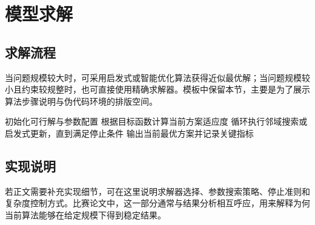 \section{模型求解}

\subsection{求解流程}

当问题规模较大时，可采用启发式或智能优化算法获得近似最优解；当问题规模较小且约束较规整时，也可直接使用精确求解器。模板中保留本节，主要是为了展示算法步骤说明与伪代码环境的排版空间。

\begin{algorithm}[H]
\caption{示意性求解流程}
初始化可行解与参数配置\;
根据目标函数计算当前方案适应度\;
循环执行邻域搜索或启发式更新，直到满足停止条件\;
输出当前最优方案并记录关键指标\;
\end{algorithm}

\subsection{实现说明}

若正文需要补充实现细节，可在这里说明求解器选择、参数搜索策略、停止准则和复杂度控制方式。比赛论文中，这一部分通常与结果分析相互呼应，用来解释为何当前算法能够在给定规模下得到稳定结果。
